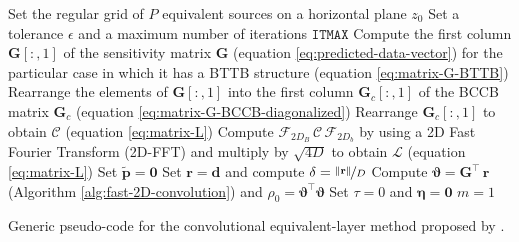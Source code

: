 \begin{algorithm}
	\Input{}
	Set the regular grid of $P$ equivalent sources on a horizontal plane $z_{0}$ \;
	Set a tolerance $\epsilon$ and a maximum number of iterations $\mathtt{ITMAX}$ \;
	Compute the first column $\mathbf{G}[:,1]$ of the sensitivity matrix $\mathbf{G}$ (equation \ref{eq:predicted-data-vector}) 
	for the particular case in which it has a BTTB structure (equation \ref{eq:matrix-G-BTTB})\;
	Rearrange the elements of $\mathbf{G}[:,1]$ into the first column $\mathbf{G}_{c}[:,1]$ of the BCCB matrix $\mathbf{G}_{c}$ (equation \ref{eq:matrix-G-BCCB-diagonalized})\;
	Rearrange $\mathbf{G}_{c}[:,1]$ to obtain $\boldsymbol{\mathcal{C}}$ (equation \ref{eq:matrix-L})\;
	Compute $\boldsymbol{\mathcal{F}}_{2D_{B}} \, \boldsymbol{\mathcal{C}} \, \boldsymbol{\mathcal{F}}_{2D_{b}}$ by using a 2D Fast Fourier
	Transform (2D-FFT) and multiply by $\sqrt{4D}$ to obtain $\boldsymbol{\mathcal{L}}$ (equation \ref{eq:matrix-L})\;
	Set $\tilde{\mathbf{p}} = \mathbf{0}$ \;
	Set $\mathbf{r} = \mathbf{d}$ and compute $\delta = \nicefrac{\| \mathbf{r} \|}{D}$ \;
	Compute $\boldsymbol{\vartheta} = \mathbf{G}^{\top} \, \mathbf{r}$ (Algorithm \ref{alg:fast-2D-convolution}) and $\rho_{0} = \boldsymbol{\vartheta}^{\top} \boldsymbol{\vartheta}$ \;
	Set $\tau = 0$ and $\boldsymbol{\eta} = \mathbf{0}$ \;
	$m = 1$ \;
	\caption{Generic pseudo-code for the convolutional equivalent-layer method proposed by 
	\citet{takahashi-etal2020,takahashi-etal2022}.}
	\label{alg:TOB-2020-2022}
\end{algorithm}

